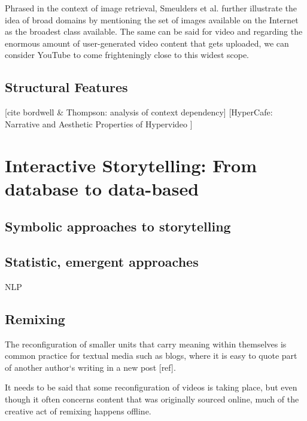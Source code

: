 Phrased in the context of image retrieval, Smeulders et al. further illustrate the idea of broad domains by mentioning the set of images available on the Internet as the broadest class available. The same can be said for video and regarding the enormous amount of user-generated video content that gets uploaded, we can consider YouTube to come frighteningly close to this widest scope.


\subsection{Structural Features}

[cite bordwell \& Thompson: analysis of context dependency]
[HyperCafe: Narrative and Aesthetic Properties of Hypervideo \cite{Sawhney:1996tk}]


\section{Interactive Storytelling: From database to data-based}

\subsection{Symbolic approaches to storytelling}
\cite{Vilmos:2011wv,RodrigoLaiolaGuimaraes:2011tl,Ursu:2009gc}

\subsection{Statistic, emergent approaches}
\label{sec:statistic}

NLP

\subsection{Remixing}

The reconfiguration of smaller units that carry meaning within themselves is common practice for textual media such as blogs, where it is easy to quote part of  another author`s writing in a new post [ref]. 

It needs to be said that some reconfiguration of videos is taking place, but even though it often concerns content that was originally sourced online, much of the creative act of remixing happens offline.


